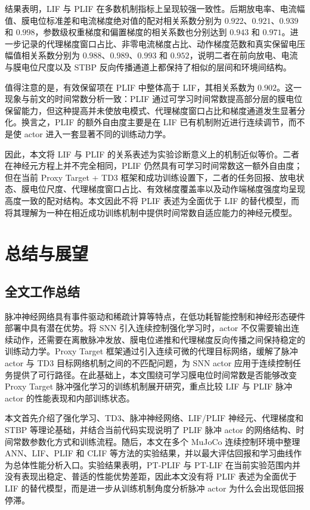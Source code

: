 \documentclass[UTF8,zihao=-4,oneside,openany]{ctexbook}
\begin{document}
结果表明，LIF 与 PLIF 在多数机制指标上呈现较强一致性。后期放电率、电流幅值、膜电位标准差和电流梯度绝对值的配对相关系数分别为 $0.922$、$0.921$、$0.939$ 和 $0.998$，参数级权重梯度和偏置梯度的相关系数也分别达到 $0.943$ 和 $0.971$。进一步记录的代理梯度窗口占比、非零电流梯度占比、动作梯度范数和真实保留电压幅值相关系数分别为 $0.988$、$0.989$、$0.993$ 和 $0.952$，说明二者在前向放电、电流与膜电位尺度以及 STBP 反向传播通道上都保持了相似的层间和环境间结构。

值得注意的是，有效保留项在 PLIF 中整体高于 LIF，其相关系数为 $0.902$。这一现象与前文的时间常数分析一致：PLIF 通过可学习时间常数提高部分层的膜电位保留能力，但这种提高并未使放电模式、代理梯度窗口占比和梯度通道发生显著分化。换言之，PLIF 的额外自由度主要是在 LIF 已有机制附近进行连续调节，而不是使 actor 进入一套显著不同的训练动力学。

因此，本文将 LIF 与 PLIF 的关系表述为实验诊断意义上的机制近似等价。二者在神经元方程上并不完全相同，PLIF 仍然具有可学习时间常数这一额外自由度；但在当前 Proxy Target + TD3 框架和成功训练设置下，二者的任务回报、放电状态、膜电位尺度、代理梯度窗口占比、有效梯度覆盖率以及动作端梯度强度均呈现高度一致的配对结构。本文因此不将 PLIF 表述为全面优于 LIF 的替代模型，而将其理解为一种在相近成功训练机制中提供时间常数自适应能力的神经元模型。

\FloatBarrier

\chapter{总结与展望}

\section{全文工作总结}
脉冲神经网络具有事件驱动和稀疏计算等特点，在低功耗智能控制和神经形态硬件部署中具有潜在优势。将 SNN 引入连续控制强化学习时，actor 不仅需要输出连续动作，还需要在离散脉冲发放、膜电位递推和代理梯度反向传播之间保持稳定的训练动力学。Proxy Target 框架通过引入连续可微的代理目标网络，缓解了脉冲 actor 与 TD3 目标网络机制之间的不匹配问题，为 SNN actor 应用于连续控制任务提供了可行路径。在此基础上，本文围绕可学习膜电位时间常数是否能够改变 Proxy Target 脉冲强化学习的训练机制展开研究，重点比较 LIF 与 PLIF 脉冲 actor 的性能表现和内部训练状态。

本文首先介绍了强化学习、TD3、脉冲神经网络、LIF/PLIF 神经元、代理梯度和 STBP 等理论基础，并结合当前代码实现说明了 PLIF 脉冲 actor 的网络结构、时间常数参数化方式和训练流程。随后，本文在多个 MuJoCo 连续控制环境中整理 ANN、LIF、PLIF 和 CLIF 等方法的实验结果，并以最大评估回报和学习曲线作为总体性能分析入口。实验结果表明，PT-PLIF 与 PT-LIF 在当前实验范围内并没有表现出稳定、普适的性能优势差距，因此本文没有将 PLIF 表述为全面优于 LIF 的替代模型，而是进一步从训练机制角度分析脉冲 actor 为什么会出现低回报停滞。
\end{document}
